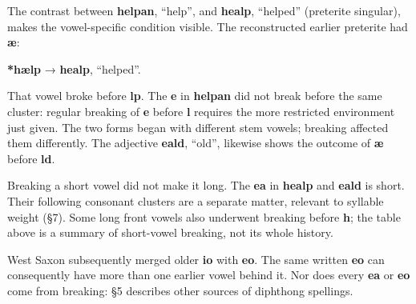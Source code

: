 The contrast between \textbf{helpan}, “help”, and \textbf{healp}, “helped” (preterite singular), makes the vowel-specific condition visible. The reconstructed earlier preterite had \textbf{æ}:\par
\textbf{*hælp} → \textbf{healp}, “helped”.\par
That vowel broke before \textbf{lp}. The \textbf{e} in \textbf{helpan} did not break before the same cluster: regular breaking of \textbf{e} before \textbf{l} requires the more restricted environment just given. The two forms began with different stem vowels; breaking affected them differently. The adjective \textbf{eald}, “old”, likewise shows the outcome of \textbf{æ} before \textbf{ld}.\par
Breaking a short vowel did not make it long. The \textbf{ea} in \textbf{healp} and \textbf{eald} is short. Their following consonant clusters are a separate matter, relevant to syllable weight (§7). Some long front vowels also underwent breaking before \textbf{h}; the table above is a summary of short-vowel breaking, not its whole history.\par
West Saxon subsequently merged older \textbf{io} with \textbf{eo}. The same written \textbf{eo} can consequently have more than one earlier vowel behind it. Nor does every \textbf{ea} or \textbf{eo} come from breaking: §5 describes other sources of diphthong spellings.\par
